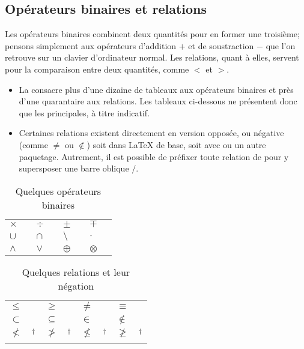 \subsection{Opérateurs binaires et relations}
\label{sec:math:symboles:binaires+relations}

Les opérateurs binaires combinent deux quantités pour en former une
troisième; pensons simplement aux opérateurs d'addition $+$ et de
soustraction $-$ que l'on retrouve sur un clavier d'ordinateur normal.
Les relations, quant à elles, servent pour la comparaison entre deux
quantités, comme  $<$ et $>$.

\begin{itemize}
\item La %
  consacre plus d'une dizaine de tableaux aux opérateurs binaires et
  près d'une quarantaire aux relations. Les tableaux ci-dessous ne
  présentent donc que les principales, à titre indicatif.
\item Certaines relations existent directement en version opposée, ou
  négative (comme $\neq$ ou $\notin$) soit dans {\LaTeX} de base, soit
  avec  ou un autre paquetage. Autrement, il est possible
  de préfixer toute relation de \cmd{\not} pour y supersposer une
  barre oblique $/$.
\end{itemize}

\begin{table}[h]
  \caption{Quelques opérateurs binaires}
  \label{tab:math:binaires}
  \begin{tabularx}{1.0\linewidth}{lXlXlXlX}
    $\times$    & \cmd{\times} &
    $\div$      & \cmd{\div}   &
    $\pm$       & \cmd{\pm}    &
    $\mp$       & \cmd{\mp}    \\
    $\cup$      & \cmd{\cup} &
    $\cap$      & \cmd{\cap} &
    $\setminus$ & \cmd{\setminus} &
    $\cdot$     & \cmd{\cdot}  \\
    $\wedge$    & \cmd{\wedge} &
    $\vee$      & \cmd{\vee} &
    $\oplus$    & \cmd{\oplus} &
    $\otimes$   & \cmd{\otimes}
  \end{tabularx}
\end{table}

\begin{table}[h]
  \caption{Quelques relations et leur négation}
  \label{tab:math:binaires}
  \begin{tabularx}{1.0\linewidth}{lXlXlXlX}
    $\leq$      & \cmd{\leq} &
    $\geq$      & \cmd{\geq}   &
    $\neq$      & \cmd{\neq}    &
    $\equiv$    & \cmd{\equiv}    \\
    $\subset$   & \cmd{\subset} &
    $\subseteq$ & \cmd{\subseteq}  &
    $\in$       & \cmd{\in} &
    $\notin$    & \cmd{\notin} \\
    $\nless$    & \cmd{\nless}$^\dagger$ &
    $\ngtr$     & \cmd{\ngtr}$^\dagger$   &
    $\nleq$     & \cmd{\nleq}$^\dagger$    &
    $\ngeq$     & \cmd{\ngeq}$^\dagger$ \\
    \addlinespace
  \end{tabularx}
\end{table}

